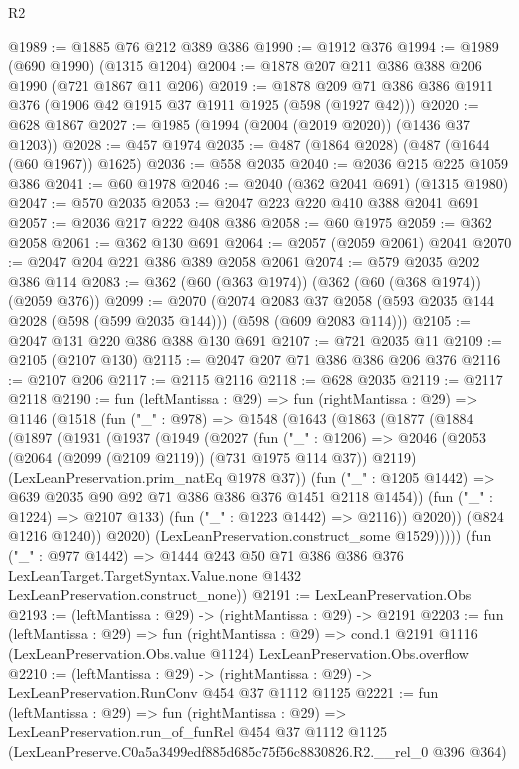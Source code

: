 \begin{lexlean}{R2}
\begin{coremodule}
@1989 := @1885 @76 @212 @389 @386
@1990 := @1912 @376
@1994 := @1989 (@690 @1990) (@1315 @1204)
@2004 := @1878 @207 @211 @386 @388 @206 @1990 (@721 @1867 @11 @206)
@2019 := @1878 @209 @71 @386 @386 @1911 @376 (@1906 @42 @1915 @37 @1911 @1925 (@598 (@1927 @42)))
@2020 := @628 @1867
@2027 := @1985 (@1994 (@2004 (@2019 @2020)) (@1436 @37 @1203))
@2028 := @457 @1974
@2035 := @487 (@1864 @2028) (@487 (@1644 (@60 @1967)) @1625)
@2036 := @558 @2035
@2040 := @2036 @215 @225 @1059 @386
@2041 := @60 @1978
@2046 := @2040 (@362 @2041 @691) (@1315 @1980)
@2047 := @570 @2035
@2053 := @2047 @223 @220 @410 @388 @2041 @691
@2057 := @2036 @217 @222 @408 @386
@2058 := @60 @1975
@2059 := @362 @2058
@2061 := @362 @130 @691
@2064 := @2057 (@2059 @2061) @2041
@2070 := @2047 @204 @221 @386 @389 @2058 @2061
@2074 := @579 @2035 @202 @386 @114
@2083 := @362 (@60 (@363 @1974)) (@362 (@60 (@368 @1974)) (@2059 @376))
@2099 := @2070
    (@2074
      @2083
      @37
      @2058
      (@593 @2035 @144 @2028 (@598 (@599 @2035 @144)))
      (@598 (@609 @2083 @114)))
@2105 := @2047 @131 @220 @386 @388 @130 @691
@2107 := @721 @2035 @11
@2109 := @2105 (@2107 @130)
@2115 := @2047 @207 @71 @386 @386 @206 @376
@2116 := @2107 @206
@2117 := @2115 @2116
@2118 := @628 @2035
@2119 := @2117 @2118
@2190 := fun (leftMantissa : @29) =>
  fun (rightMantissa : @29) =>
  @1146
    (@1518
      (fun ("_" : @978) =>
      @1548
        (@1643
          (@1863
            (@1877
              (@1884
                (@1897
                  (@1931
                    (@1937
                      (@1949
                        (@2027
                          (fun ("_" : @1206) =>
                          @2046
                            (@2053 (@2064 (@2099 (@2109 @2119)) (@731 @1975 @114 @37)) @2119)
                            (LexLeanPreservation.prim_natEq @1978 @37))
                          (fun ("_" : @1205 @1442) =>
                          @639 @2035 @90 @92 @71 @386 @386 @376 @1451 @2118 @1454))
                        (fun ("_" : @1224) => @2107 @133)
                        (fun ("_" : @1223 @1442) => @2116))
                      @2020))
                  (@824 @1216 @1240))
                @2020)
              (LexLeanPreservation.construct_some @1529)))))
      (fun ("_" : @977 @1442) =>
      @1444
        @243
        @50
        @71
        @386
        @386
        @376
        LexLeanTarget.TargetSyntax.Value.none
        @1432
        LexLeanPreservation.construct_none))
@2191 := LexLeanPreservation.Obs
@2193 := (leftMantissa : @29) -> (rightMantissa : @29) -> @2191
@2203 := fun (leftMantissa : @29) =>
  fun (rightMantissa : @29) =>
  cond.{1} @2191 @1116 (LexLeanPreservation.Obs.value @1124) LexLeanPreservation.Obs.overflow
@2210 := (leftMantissa : @29) ->
  (rightMantissa : @29) -> LexLeanPreservation.RunConv @454 @37 @1112 @1125
@2221 := fun (leftMantissa : @29) =>
  fun (rightMantissa : @29) =>
  LexLeanPreservation.run_of_funRel
    @454
    @37
    @1112
    @1125
    (LexLeanPreserve.C0a5a3499edf885d685c75f56c8830826.R2.__rel_0 @396 @364)
\end{coremodule}
\end{lexlean}
